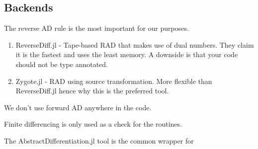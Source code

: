 \documentclass[10pt]{article}
\begin{document}
\subsection{Backends}

The reverse AD rule is the most important for our purposes.

\begin{enumerate}
	\item ReverseDiff.jl - Tape-based RAD that makes use of dual numbers. They claim it is the fastest and uses the least memory. A downside is that your code should not be type annotated.
	\item Zygote.jl - RAD using source transformation. More flexible than ReverseDiff.jl hence why this is the preferred tool.
\end{enumerate}

We don't use forward AD anywhere in the code.

Finite differencing is only used as a check for the routines.

The AbstractDifferentiation.jl tool is the common wrapper for


\onecolumn
\appendix

\end{document}
